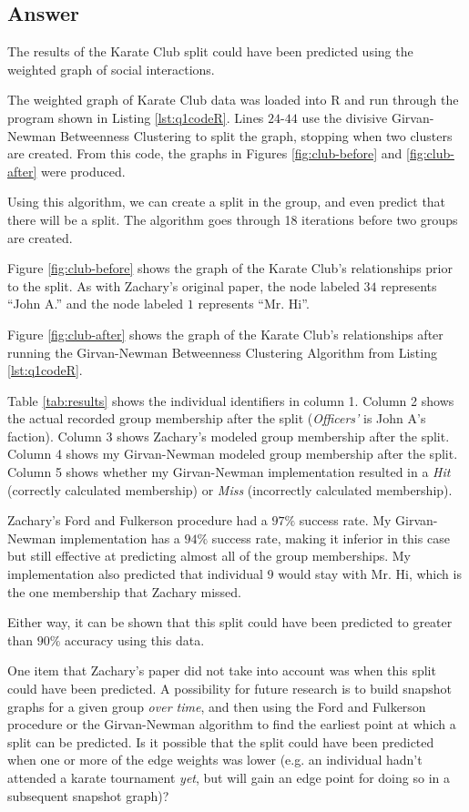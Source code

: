 \documentclass[letterpaper,11pt]{article}
\begin{document}
\newpage
\subsection*{Answer}

The results of the Karate Club split could have been predicted using the weighted graph of social interactions.

The weighted graph of Karate Club data was loaded into R and run through the program shown in Listing \ref{lst:q1codeR}.  Lines $24$-$44$ use the divisive Girvan-Newman Betweenness Clustering to split the graph, stopping when two clusters are created.  From this code, the graphs in Figures \ref{fig:club-before} and \ref{fig:club-after} were produced.

Using this algorithm, we can create a split in the group, and even predict that there will be a split.  The algorithm goes through 18 iterations before two groups are created.

Figure \ref{fig:club-before} shows the graph of the Karate Club's relationships prior to the split.  As with Zachary's original paper, the node labeled $34$ represents ``John A.'' and the node labeled $1$ represents ``Mr. Hi''.

Figure \ref{fig:club-after} shows the graph of the Karate Club's relationships after running the Girvan-Newman Betweenness Clustering Algorithm from Listing \ref{lst:q1codeR}.

Table \ref{tab:results} shows the individual identifiers in column 1.  Column 2 shows the actual recorded group membership after the split (\emph{Officers'} is John A's faction).  Column 3 shows Zachary's modeled group membership after the split.  Column 4 shows my Girvan-Newman modeled group membership after the split.  Column 5 shows whether my Girvan-Newman implementation resulted in a \emph{Hit} (correctly calculated membership) or \emph{Miss} (incorrectly calculated membership).

Zachary's Ford and Fulkerson procedure had a $97\%$ success rate.  My Girvan-Newman implementation has a $94\%$ success rate, making it inferior in this case but still effective at predicting almost all of the group memberships.  My implementation also predicted that individual $9$ would stay with Mr. Hi, which is the one membership that Zachary missed.

Either way, it can be shown that this split could have been predicted to greater than $90\%$ accuracy using this data.

One item that Zachary's paper did not take into account was when this split could have been predicted.  A possibility for future research is to build snapshot graphs for a given group \emph{over time}, and then using the Ford and Fulkerson procedure or the Girvan-Newman algorithm to find the earliest point at which a split can be predicted.  Is it possible that the split could have been predicted when one or more of the edge weights was lower (e.g. an individual hadn't attended a karate tournament \emph{yet}, but will gain an edge point for doing so in a subsequent snapshot graph)?
\end{document}
